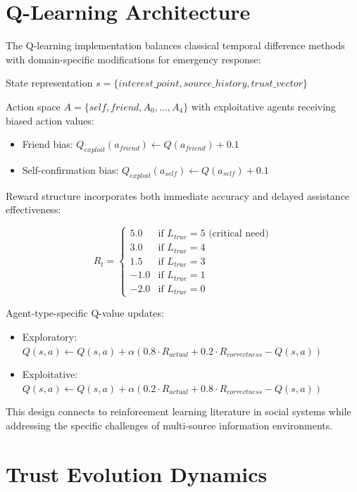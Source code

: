 \documentclass[pdflatex,sn-apa]{sn-jnl}%
\begin{document}
\begin{appendices}
\section{Q-Learning Architecture}

The Q-learning implementation balances classical temporal difference methods with domain-specific modifications for emergency response:

State representation $s = \{interest\_point, source\_history, trust\_vector\}$

Action space $A = \{self, friend, A_0, ..., A_4\}$ with exploitative agents receiving biased action values:
\begin{itemize}
   \item Friend bias: $Q_{exploit}(a_{friend}) \leftarrow Q(a_{friend}) + 0.1$
   \item Self-confirmation bias: $Q_{exploit}(a_{self}) \leftarrow Q(a_{self}) + 0.1$
\end{itemize}

Reward structure incorporates both immediate accuracy and delayed assistance effectiveness:

\begin{equation}
R_t = \begin{cases}
5.0 & \text{if } L_{true} = 5 \text{ (critical need)} \\
3.0 & \text{if } L_{true} = 4 \\
1.5 & \text{if } L_{true} = 3 \\
-1.0 & \text{if } L_{true} = 1 \\
-2.0 & \text{if } L_{true} = 0
\end{cases}
\end{equation}

Agent-type-specific Q-value updates:
\begin{itemize}
   \item Exploratory: $Q(s,a) \leftarrow Q(s,a) + \alpha (0.8 \cdot R_{actual} + 0.2 \cdot R_{correctness} - Q(s,a))$
   \item Exploitative: $Q(s,a) \leftarrow Q(s,a) + \alpha (0.2 \cdot R_{actual} + 0.8 \cdot R_{correctness} - Q(s,a))$
\end{itemize}

This design connects to reinforcement learning literature in social systems \citep{shoham2003multi} while addressing the specific challenges of multi-source information environments.

\section{Trust Evolution Dynamics}


\end{appendices}
\end{document}
